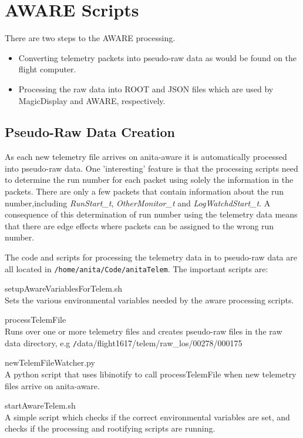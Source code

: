 \documentclass{article}
\begin{document}
\section{AWARE Scripts}
There are two steps to the AWARE processing.
\begin{itemize}
\item Converting telemetry packets into pseudo-raw data as would be found on the flight computer.
\item Processing the raw data into ROOT and JSON files which are used by MagicDisplay and AWARE, respectively.
\end{itemize}

\subsection{Pseudo-Raw Data Creation}
As each new telemetry file arrives on anita-aware it is automatically processed into pseudo-raw data. One 'interesting' feature is that the processing scripts need to determine the run number for each packet using solely the information in the packets. There are only a few packets that contain information about the run number,including {\it RunStart\_t}, {\it OtherMonitor\_t} and {\it LogWatchdStart\_t}. A consequence of this determination of run number using the telemetry data means that there are edge effects where packets can be assigned to the wrong run number.

The code and scripts for processing the telemetry data in to pseudo-raw data are all located in {\tt /home/anita/Code/anitaTelem}. The important scripts are:
\begin{description}
\item{setupAwareVariablesForTelem.sh} \\Sets the various environmental variables needed by the aware processing scripts.
\item{processTelemFile} \\Runs over one or more telemetry files and creates pseudo-raw files in the raw data directory, e.g  {\texttt /data/flight1617/telem/raw\_los/00278/000175}
\item{newTelemFileWatcher.py} \\A python script that uses libinotify to call processTelemFile when new telemetry files arrive on anita-aware.
\item{startAwareTelem.sh} \\A simple script which checks if the correct environmental variables are set, and checks if the processing and rootifying scripts are running.
\end{description}
\end{document}

